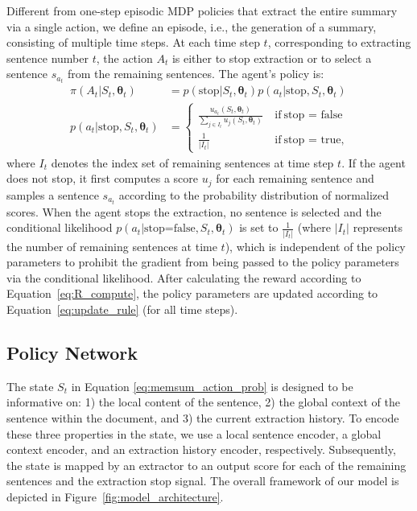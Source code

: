 \documentclass[11pt]{article}
\begin{document}
Different from one-step episodic MDP policies \cite{narayan2018ranking,dong2018banditsum,luo2019reading} that extract the entire summary via a single action, we define an episode, i.e., the generation of a summary, consisting of multiple time steps. At each time step $t$, corresponding to extracting sentence number $t$, the action $A_t$ is either to stop extraction or to select a sentence $s_{a_t}$ from the remaining sentences. The agent's policy is:
\begin{equation}
\label{eq:memsum_action_prob}
\begin{aligned}
\pi(A_t\vert S_t,\bm{\theta}_t) &= p(\text{stop}|S_t, \bm{\theta}_t) p(a_t|\text{stop},S_t, \bm{\theta}_t)\\
p(a_t|\text{stop},S_t, \bm{\theta}_t) &= \begin{cases}
\frac{ u_{a_t}(S_t,\bm{\theta}_t) }{ \sum_{j\in I_t} u_j( S_t,\bm{\theta}_t ) } \ &\text{if} \ \text{stop = false} \\
\frac{1}{\vert I_t \vert} &\text{if} \ \text{stop = true},
\end{cases}
\end{aligned}
\end{equation}
where $I_t$ denotes the index set of remaining sentences at time step $t$. If the agent does not stop, it first computes a score $u_j$ for each remaining sentence and samples a sentence $s_{a_t}$ according to the probability distribution of normalized scores. 
When the agent stops the extraction, no sentence is selected and the conditional likelihood $p(a_t|\text{stop=false},S_t, \bm{\theta}_t)$ is set to $\frac{1}{\vert I_t \vert}$ (where $\vert I_t \vert$ represents the number of remaining sentences at time $t$), which is independent of the policy parameters to prohibit the gradient from being passed to the policy parameters via the conditional likelihood. After calculating the reward according to Equation~\eqref{eq:R_compute}, the policy parameters are updated according to Equation~\eqref{eq:update_rule} (for all time steps).

\subsection{Policy Network}
\label{sec:policy_network_structure}
The state $S_t$ in Equation \eqref{eq:memsum_action_prob} is designed to be informative on: 1) the local content of the sentence, 2) the global context of the sentence within the document, and 3) the current extraction history. To encode these three properties in the state, we use a local sentence encoder, a global context encoder, and an extraction history encoder, respectively. Subsequently, the state is mapped by an extractor to an output score for each of the remaining sentences and the extraction stop signal. The overall framework of our model is depicted in Figure~\ref{fig:model_architecture}. 
\end{document}
